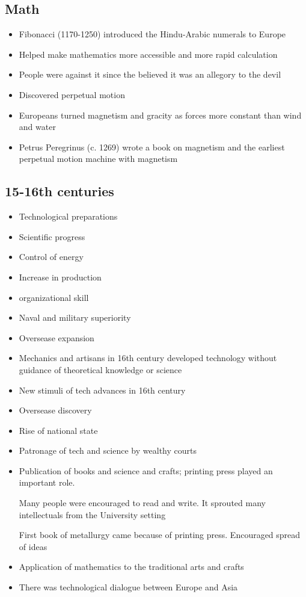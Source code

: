 \documentclass{article}
\begin{document}
\subsection{Math}
\begin{itemize}
  \item Fibonacci (1170-1250) introduced the Hindu-Arabic numerals to Europe
  \item Helped make mathematics more accessible and more rapid calculation
  \item People were against it since the believed
    it was an allegory to the devil
  \item Discovered perpetual motion
  \item Europeans turned magnetism and gracity as forces more
    constant than wind and water
  \item Petrus Peregrinus (c. 1269) wrote a book on magnetism
    and the earliest perpetual motion machine with magnetism
\end{itemize}

\subsection{15-16th centuries}
\begin{itemize}
  \item Technological preparations
  \item Scientific progress
  \item Control of energy
  \item Increase in production
  \item organizational skill
  \item Naval and military superiority
  \item Oversease expansion
  \item Mechanics and artisans in 16th century developed technology
    without guidance of theoretical knowledge
    or science
  \item New stimuli of tech advances in 16th century
  \item Oversease discovery
  \item Rise of national state
  \item Patronage of tech and science by wealthy courts
  \item Publication of books and science and crafts;
    printing press played an important role.

    Many people were encouraged to read and write.
    It sprouted many intellectuals from the University setting

    First book of metallurgy came because of printing press.
    Encouraged spread of ideas
  \item Application of mathematics to the traditional
    arts and crafts
  \item There was technological dialogue between Europe and Asia
\end{itemize}
\end{document}
